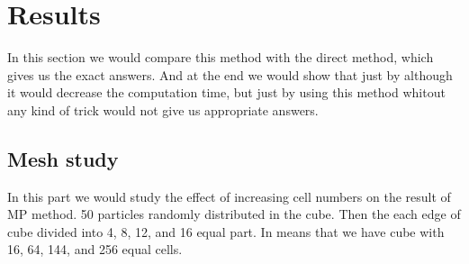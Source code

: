 \documentclass[10pt]{article}
\begin{document}
\section{Results}

In this section we would compare this method with the direct method, which gives us the exact answers. And at the end we would show that just by although it would decrease the computation time, but just by using this method whitout any kind of trick would not give us appropriate answers.\\

\subsection{Mesh study}

In this part we would study the effect of increasing cell numbers on the result of MP method. 50 particles randomly distributed in the cube. Then the each edge of cube divided into 4, 8, 12, and 16 equal part. In means that we have cube with 16, 64, 144, and 256 equal cells. \\
\end{document}
